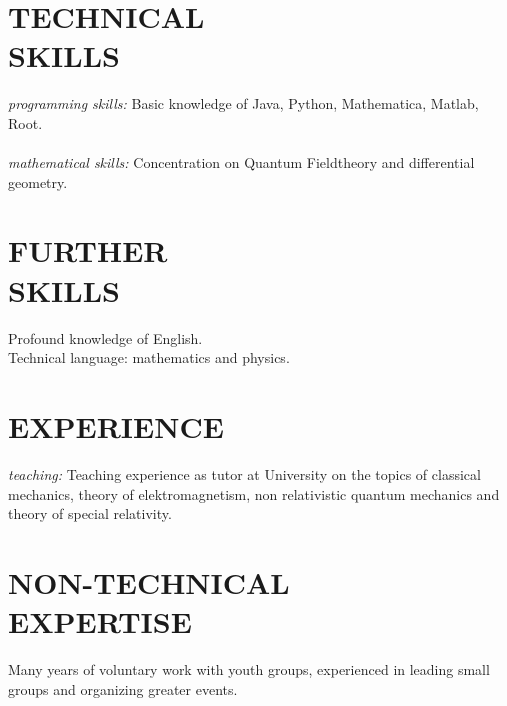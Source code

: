 \documentclass[margin,12pt]{res} %
\begin{document}
\begin{resume}
\section{TECHNICAL \\ SKILLS} 

{\sl programming skills:} 
Basic knowledge of Java, Python, Ma\-the\-ma\-ti\-ca, Mat\-lab, Root. \\\\
{\sl mathematical skills:}  
Concentration on Quantum Fieldtheory and differential geometry.

\section{FURTHER\\ SKILLS} 
Profound knowledge of English.			\\
Technical language: mathematics and physics.	\\


 
\section{EXPERIENCE}

{\sl teaching:} Teaching experience as tutor at University on the 
to\-pics of classical mechanics, theory of elektromagnetism, non relativistic quantum mechanics and theory of special relativity.

\section{NON-TECHNICAL \\ EXPERTISE}

Many years of voluntary work with youth groups, experienced in leading 
small groups and organizing greater events.


\end{resume}
\end{document}
